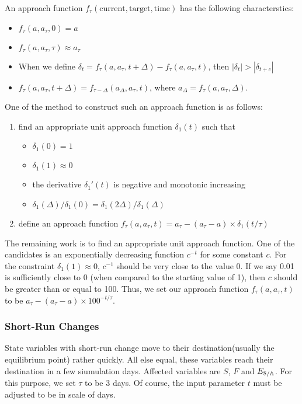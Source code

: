 \documentclass[a4paper,11pt]{scrartcl}
\newcommand{\dd}{\text{\textdollar}}
\newcommand{\amom}{\mathbb{A}}
\begin{document}
An approach function $f_\tau(\text{current}, \text{target}, \text{time})$ has
the following characterstics:
\begin{itemize}
	\item{$f_\tau(a, a_\tau, 0) = a$}
	\item{$f_\tau(a, a_\tau, \tau) \approx a_\tau$}
	\item{When we define $\delta_t = f_\tau(a, a_\tau, t + \Delta) - f_\tau(a,
			a_\tau, t)$, then $|\delta_t| > |\delta_{t+c}|$}
	\item{$f_\tau(a, a_\tau, t+\Delta) = f_{\tau-\Delta}(a_\Delta, a_\tau,
		t)$}, where $a_\Delta = f_\tau(a, a_\tau, \Delta)$.
\end{itemize}

One of the method to construct such an approach function is as follows:
\begin{enumerate}
	\item{find an appropriate unit approach function $\delta_1(t)$ such that}
		\begin{itemize}
			\item{$\delta_1(0) = 1$}
			\item{$\delta_1(1) \approx 0$}
			\item{the derivative $\delta_1'(t)$ is negative and monotonic
				increasing}
			\item{$\delta_1(\Delta) / \delta_1(0) = 
				\delta_1(2\Delta) / \delta_1(\Delta)$}
		\end{itemize}
	\item{define an approach function
		$f_\tau(a, a_\tau, t) = a_\tau - (a_\tau - a) \times \delta_1(t/\tau)$}
\end{enumerate}
The remaining work is to find an appropriate unit approach function. One of the
candidates is an exponentially decreasing function $c^{-t}$ for some constant
$c$. For the constraint $\delta_1(1) \approx 0$, $c^{-1}$ should be very close
to the value 0. If we say 0.01 is sufficiently close to 0 (when compared to the
starting value of 1), then $c$ should be greater than or equal to 100. Thus,
we set our approach function $f_\tau(a, a_\tau, t)$ to be $a_\tau - (a_\tau -
a) \times 100^{-t/\tau}$.

\subsubsection{Short-Run Changes}
State variables with short-run change move to their destination(usually the
equilibrium point) rather quickly. All else equal, these variables reach their
destination in a few siumulation days. Affected variables are $S$, $F$ and
$E_{\dd/\amom}$. For this purpose, we set $\tau$ to be 3 days. Of course, the
input parameter $t$ must be adjusted to be in scale of days.
\end{document}

